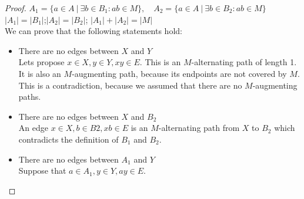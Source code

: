 \documentclass[notitlepage, 12pt]{article}
\begin{document}
\begin{proof}
  \noindent $A_1 = \{ a\in A\ |\ \exists b \in B_1: ab \in M \}, \quad A_2 = \{ a\in A\ |\ \exists b \in B_2: ab \in M \}$\\

  $|A_1| = |B_1|$;\quad $|A_2| = |B_2|$; \quad$|A_1| + |A_2| = |M|$\\

  We can prove that the following statements hold:
  \begin{itemize}
    \item There are no edges between $X$ and $Y$ \\
    Lets propose $x \in X, y \in Y, xy \in E$. This is an $M$-alternating path of length 1.
    It is also an $M$-augmenting path, because its endpoints are not covered by $M$. This
    is a contradiction, because we assumed that there are no $M$-augmenting paths.
    \item There are no edges between $X$ and $B_2$ \\
    An edge $x\in X,b\in B2, xb\in E$ is an $M$-alternating path from $X$ to $B_2$ which 
    contradicts the definition of $B_1$ and $B_2$.
    \newpage
    \item There are no edges between $A_1$ and $Y$ \\
    Suppose that $a\in A_1, y\in Y, ay\in E$.

    \begin{center}
  \end{center}


\end{itemize}
\end{proof}
\end{document}
